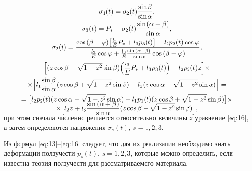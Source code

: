 \begin{gather}

\label{eq:13}

\sigma_{1}(t) = \sigma_{2}(t) \frac{\sin{\beta}}{\sin{\alpha}},

\\

\label{eq:14}

\sigma_{3}(t) = P_\ast - \sigma_{2}(t) \frac{\sin{(\alpha+\beta})}{\sin{\alpha}},

\\

\label{eq:15}

\sigma_{2} (t) = \frac{\cos{(\beta - \varphi)} \bigl[ \frac{l_3}{E} P_\ast + l_3 p_3 (t) \bigr] - l_2 p_2 (t) \cos{\varphi}}{\frac{l_2}{E} \cos{\varphi} + \frac{l_3}{E} \frac{\sin{(\alpha+\beta)}}{\sin{\alpha}} \cos{(\beta-\varphi)}}, 

\\

\label{eq:16}

\Bigl[ (z \cos{\beta} + \sqrt{1-z^2} \sin{\beta}) \Bigl( \frac{l_3}{E} P_\ast + l_3 p_3 (t) \Bigr) - l_2 p_2(t) z \Bigr] \times \\ 

\times \Bigl[ l_1 \frac{\sin{\beta}}{\sin{\alpha}} (z \cos{\beta} + \sqrt{1-z^2} \sin{\beta}) - l_2 (z \cos{\alpha} - \sqrt{1-z^2} \sin{\alpha}) \Bigr] = \\

\vspace{-3mm}

= \bigl[ l_2 p_2 (t) (z \cos{\alpha} - \sqrt{1-z^2} \sin{\alpha}) - l_1 p_1 (t) (z \cos{\beta} + \sqrt{1-z^2} \sin{\beta}) \bigr] \times \\ 

\vspace{-5mm}

\times \Bigl[ l_2 z + l_3 \frac{\sin{(\alpha+\beta)}}{\sin{\alpha}} (z \cos{\beta} + \sqrt{1-z^2} \sin{\beta}) \Bigr],

\end{gather}

при этом сначала численно решается относительно величины $z$ уравнение \eqref{eq:16}, а затем определяются напряжения $\sigma_s (t)$, $s=1,2,3$. 

Из формул \eqref{eq:13}--\eqref{eq:16} следует,  что для их реализации необходимо знать деформации ползучести $p_s (t)$, $s=1,2,3$, которые можно определить, если известна теория ползучести для рассматриваемого материала.

